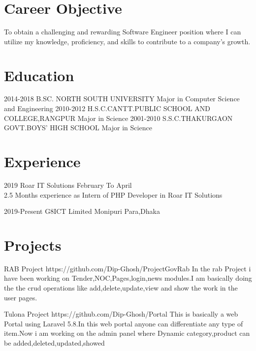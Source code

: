 \documentclass[]{cv-style}
\begin{document}
\section{Career Objective}
To obtain a challenging and rewarding Software Engineer position where I can utilize my knowledge, proficiency, and skills to contribute to a company's growth.
\section{Education}
\begin{entrylist}
  \entry
    {2014-2018} 
    {B.SC. NORTH SOUTH UNIVERSITY}
    {Major in Computer Science and Engineering}
    {}
  \entry
    {2010-2012}
    {H.S.C.CANTT.PUBLIC SCHOOL AND COLLEGE,RANGPUR}
    {Major in Science}
        {}
  \entry
    {2001-2010}
    {S.S.C.THAKURGAON GOVT.BOYS' HIGH SCHOOL}
    {Major in Science}
     {}


\end{entrylist}
\section{Experience}
\begin{entrylist}
\entry
  {2019}
  {Roar IT Solutions}
  {February To April}
  {\\
  2.5 Months experience as Intern of PHP Developer in Roar IT Solutions}
  
\entry
  {2019-Present}
  {G8ICT Limited}
  {Monipuri Para,Dhaka}
  {}

\end{entrylist}
\section{Projects}
\begin{entrylist}
\entry
{}
{RAB Project}
{{https://github.com/Dip-Ghosh/ProjectGovRab}}
{In the rab Project i have been working on Tender,NOC,Pages,login,news modules.I am basically doing the the crud operations like add,delete,update,view and show the work in the user pages.}
~
\end{entrylist}
\begin{entrylist}
\entry
{}
{Tulona Project }
{{https://github.com/Dip-Ghosh/Portal}}
{This is basically a web Portal using Laravel 5.8.In this web portal anyone can differentiate any type of item.Now i am working on the admin panel where Dynamic category,product can be added,deleted,updated,showed}

\end{entrylist}
\end{document}
